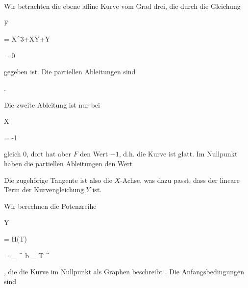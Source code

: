 {


Wir betrachten die ebene affine Kurve vom Grad drei, die durch die Gleichung


\mavergleichskette

{\vergleichskette

{ F
}

{ = }{ X^3+XY+Y
}

{ = }{ 0
}

{    }{
}

{   }{
}

}
{}{}{}
gegeben ist. Die partiellen Ableitungen sind


 { . }


Die zweite Ableitung ist nur bei


\mavergleichskette

{\vergleichskette

{ X
}

{ = }{ -1
}

{  }{
}

{    }{
}

{   }{
}

}
{}{}{}
gleich $0$, dort hat aber $F$ den Wert $-1$, d.h. die Kurve ist glatt. Im Nullpunkt haben die partiellen Ableitungen den Wert

 Die zugehörige Tangente ist also die $X$-Achse, was dazu passt, dass der lineare Term der Kurvengleichung $Y$ ist.


Wir berechnen die Potenzreihe


\mavergleichskette

{\vergleichskette

{ Y
}

{ = }{ H(T)
}

{ = }{ {\sum }_{   }^{ \infty }  b _{  \ell }  T ^{  \ell }
}

{    }{
}

{   }{
}

}
{}{}{,}
die die Kurve im Nullpunkt als Graphen beschreibt
 {} {.}
Die Anfangsbedingungen sind


}
